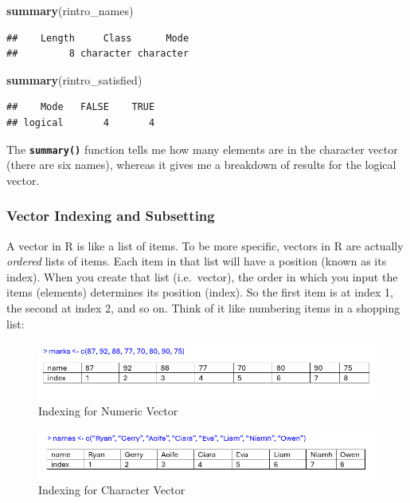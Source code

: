 \documentclass[
]{book}
\newenvironment{Shaded}{\begin{snugshade}}{\end{snugshade}}
\newcommand{\FunctionTok}[1]{\textcolor[rgb]{0.13,0.29,0.53}{\textbf{#1}}}
\newcommand{\NormalTok}[1]{#1}
\begin{document}
\begin{Shaded}
\begin{Highlighting}[]
\FunctionTok{summary}\NormalTok{(rintro\_names)}
\end{Highlighting}
\end{Shaded}

\begin{verbatim}
##    Length     Class      Mode 
##         8 character character
\end{verbatim}

\begin{Shaded}
\begin{Highlighting}[]
\FunctionTok{summary}\NormalTok{(rintro\_satisfied)}
\end{Highlighting}
\end{Shaded}

\begin{verbatim}
##    Mode   FALSE    TRUE 
## logical       4       4
\end{verbatim}

The \textbf{\texttt{summary()}} function tells me how many elements are in the character vector (there are six names), whereas it gives me a breakdown of results for the logical vector.

\subsubsection{Vector Indexing and Subsetting}\label{vector-indexing-and-subsetting}

A vector in R is like a list of items. To be more specific, vectors in R are actually \emph{ordered} lists of items. Each item in that list will have a position (known as its index). When you create that list (i.e.~vector), the order in which you input the items (elements) determines its position (index). So the first item is at index 1, the second at index 2, and so on. Think of it like numbering items in a shopping list:

\begin{figure}
\centering
\includegraphics{img/03-index_numeric.png}
\caption{\label{fig:unnamed-chunk-67}Indexing for Numeric Vector}
\end{figure}

\begin{figure}
\centering
\includegraphics{img/03-index-character.png}
\caption{\label{fig:unnamed-chunk-68}Indexing for Character Vector}
\end{figure}
\end{document}
